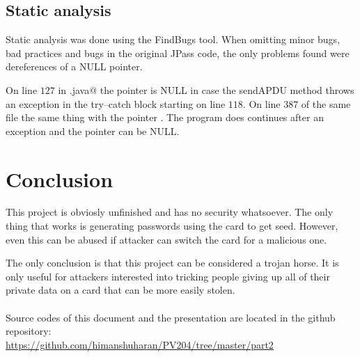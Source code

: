 \documentclass[paper=a4, fontsize=12pt]{scrartcl}
\begin{document}
\subsection{Static analysis}
Static analysis was done using the FindBugs tool.
When omitting minor bugs, bad practices and bugs in the original JPass code, the only problems found were dereferences of a NULL pointer.

On line $127$ in \verb@CardInterface.java@ the pointer \verb@response@ is NULL in case the sendAPDU method throws an exception in the try--catch block starting on line $118$.
On line $387$ of the same file the same thing with the pointer \verb@encrypted@. The program does continues after an exception and the pointer can be NULL.

\section{Conclusion}
This project is obviosly unfinished and has no security whatsoever.
The only thing that works is generating passwords using the card to get seed.
However, even this can be abused if attacker can switch the card for a malicious one.

The only conclusion is that this project can be considered a trojan horse.
It is only useful for attackers interested into tricking people giving up all of their private data on a card that can be more easily stolen.
\\
\\
Source codes of this document and the presentation are located in the github repository:
\\ \url{https://github.com/himanshuharan/PV204/tree/master/part2}
\end{document}
